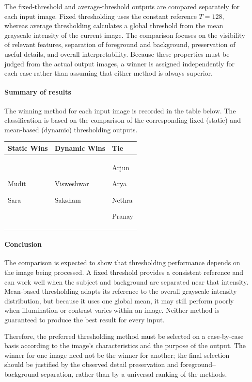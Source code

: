 The fixed-threshold and average-threshold outputs are compared separately
for each input image. Fixed thresholding uses the constant reference
$T=128$, whereas average thresholding calculates a global threshold from
the mean grayscale intensity of the current image. The comparison focuses
on the visibility of relevant features, separation of foreground and
background, preservation of useful details, and overall interpretability.
Because these properties must be judged from the actual output images, a
winner is assigned independently for each case rather than assuming that
either method is always superior.

\paragraph{Summary of results}
The winning method for each input image is recorded in the table below.
The classification is based on the comparison of the corresponding fixed
(static) and mean-based (dynamic) thresholding outputs.

\begin{center}
\renewcommand{\arraystretch}{1.45}
\setlength{\tabcolsep}{5pt}
\begin{tabular}{|>{\centering\arraybackslash}p{}|>{\centering\arraybackslash}p{}|>{\centering\arraybackslash}p{}|}
\hline
\rule{0pt}{2.8ex}\textbf{Static Wins} &
\textbf{Dynamic Wins} &
\textbf{Tie} \\
\hline
\rule{0pt}{2.6ex}Mudit\par Sara &
Visweshwar\par Saksham &
Arjun\par Arya\par Nethra\par Pranay \\
\hline
\end{tabular}
\end{center}

\paragraph{Conclusion}
The comparison is expected to show that thresholding performance depends
on the image being processed. A fixed threshold provides a consistent
reference and can work well when the subject and background are separated
near that intensity. Mean-based thresholding adapts its reference to the
overall grayscale intensity distribution, but because it uses one global
mean, it may still perform poorly when illumination or contrast varies
within an image. Neither method is guaranteed to produce the best result
for every input.

Therefore, the preferred thresholding method must be selected on a
case-by-case basis according to the image's characteristics and the
purpose of the output. The winner for one image need not be the winner for
another; the final selection should be justified by the observed detail
preservation and foreground--background separation, rather than by a
universal ranking of the methods.
